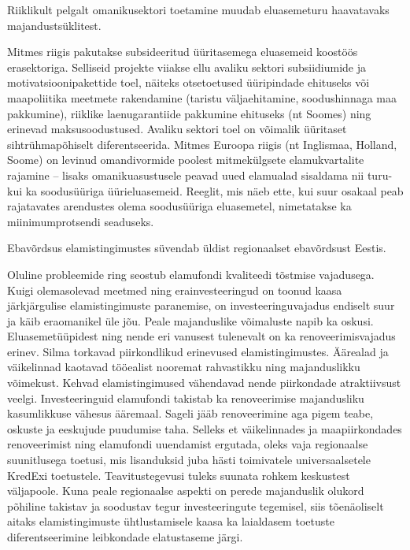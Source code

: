 \documentclass[estonian,]{article}
\begin{document}
\begin{blockquote-right}
Riiklikult pelgalt omanikusektori toetamine muudab eluasemeturu
haavatavaks majandustsüklitest.
\end{blockquote-right}

Mitmes riigis pakutakse subsideeritud üüritasemega eluasemeid koostöös erasektoriga. Selliseid projekte viiakse ellu avaliku sektori subsiidiumide ja motivatsioonipakettide toel, näiteks otsetoetused üüripindade ehituseks või maapoliitika meetmete rakendamine (taristu väljaehitamine, soodushinnaga maa pakkumine), riiklike laenugarantiide pakkumine ehituseks (nt Soomes) ning erinevad maksusoodustused. Avaliku sektori toel on võimalik üüritaset sihtrühmapõhiselt diferentseerida. Mitmes Euroopa riigis (nt Inglismaa, Holland, Soome) on levinud omandivormide poolest mitmekülgsete elamukvartalite rajamine -- lisaks omanikuasustusele peavad uued elamualad sisaldama nii turu- kui ka soodusüüriga üürieluasemeid. Reeglit, mis näeb ette, kui suur osakaal peab rajatavates arendustes olema soodusüüriga eluasemetel, nimetatakse ka miinimumprotsendi seaduseks.

\begin{blockquote-left}
Ebavõrdsus elamistingimustes süvendab üldist regionaalset ebavõrdsust
Eestis.
\end{blockquote-left}

Oluline probleemide ring seostub elamufondi kvaliteedi tõstmise vajadusega. Kuigi olemasolevad meetmed ning erainvesteeringud on toonud kaasa järkjärgulise elamistingimuste paranemise, on investeeringuvajadus endiselt suur ja käib eraomanikel üle jõu. Peale majanduslike võimaluste napib ka oskusi. Eluasemetüüpidest ning nende eri vanusest tulenevalt on ka renoveerimisvajadus erinev. Silma torkavad piirkondlikud erinevused elamistingimustes. Äärealad ja väikelinnad kaotavad tööealist nooremat rahvastikku ning majanduslikku võimekust. Kehvad elamistingimused vähendavad nende piirkondade atraktiivsust veelgi. Investeeringuid elamufondi takistab ka renoveerimise majandusliku kasumlikkuse vähesus ääremaal. Sageli jääb renoveerimine aga pigem teabe, oskuste ja eeskujude puudumise taha. Selleks et väikelinnades ja maapiirkondades renoveerimist ning elamufondi uuendamist ergutada, oleks vaja regionaalse suunitlusega toetusi, mis lisanduksid juba hästi toimivatele universaalsetele KredExi toetustele. Teavitustegevusi tuleks suunata rohkem keskustest väljapoole. Kuna peale regionaalse aspekti on perede majanduslik olukord põhiline takistav ja soodustav tegur investeeringute tegemisel, siis tõenäoliselt aitaks elamistingimuste ühtlustamisele kaasa ka laialdasem toetuste diferentseerimine leibkondade elatustaseme järgi.
\end{document}
